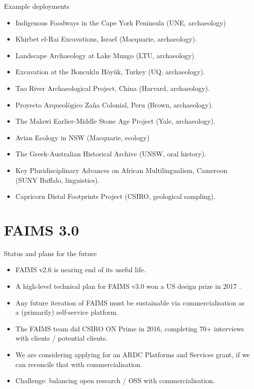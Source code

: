 \documentclass[aspectratio=169, 12pt]{beamer} %
\begin{document}
\begin{frame}{Example deployments}
 \begin{itemize}[label=\textbullet]
        \item Indigenous Foodways in the Cape York Peninsula (UNE, archaeology)
        \item Khirbet el-Rai Excavations, Israel (Macquarie, archaeology).
        \item Landscape Archaeology at Lake Mungo (LTU, archaeology)
        \item Excavation at the Boncuklu Höyük, Turkey (UQ, archaeology).
        \item Tao River Archaeological Project, China (Harvard, archaeology).
        \item Proyecto Arqueològico Zaña Colonial, Peru (Brown, archaeology).
        \item The Malawi Earlier-Middle Stone Age Project (Yale, archaeology).
        \item Avian Ecology in NSW (Macquarie, ecology)
        \item The Greek-Australian Historical Archive (UNSW, oral history).
        \item Key Pluridisciplinary Advances on African Multilingualism, Cameroon (SUNY Buffalo, linguistics).
        \item Capricorn Distal Footprints Project (CSIRO, geological sampling).

    \end{itemize}
\end{frame}

\section{FAIMS 3.0}

\begin{frame}{Status and plans for the future}
    \begin{itemize}[label=\textbullet]
        \item FAIMS v2.6 is nearing end of its useful life.
        \item A high-level technical plan for FAIMS v3.0 won a US design prize in 2017 \cite{Bureau_of_Reclamation2017-xl}.
        \item Any future iteration of FAIMS must be sustainable via commercialisation as a (primarily) self-service platform.
        \item The FAIMS team did CSIRO ON Prime in 2016, completing 70+ interviews with clients / potential clients.
        \item We are considering applying for an ARDC Platforms and Services grant, if we can reconcile that with commercialisation.
        \item Challenge: balancing open research / OSS with commercialisation.
    \end{itemize}
\end{frame}
\end{document}
